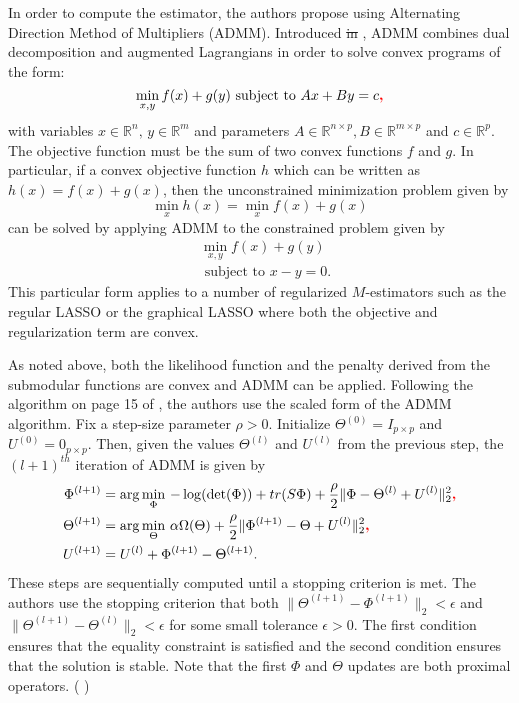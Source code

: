 \documentclass{uwstat572}
\newcommand{\vmdel}[1]{\sout{#1}}
\newcommand{\vmadd}[1]{\textbf{\color{red}{#1}}}
\newcommand{\vmcomment}[1]{({\color{blue}{VM's comment:}} \textbf{\color{blue}{#1}})}
\theoremstyle{remark}
\theoremstyle{definition}
\begin{document}
In order to compute the estimator, the authors propose using Alternating Direction Method of Multipliers (ADMM).  Introduced \vmdel{in} \vmadd{by} \cite{Boyd2011}, ADMM combines dual decomposition and augmented Lagrangians in order to solve convex programs of the form:
\begin{equation*}
    \min_{x,y} f(x) + g(y) {\text{  subject to }} Ax + By = c\vmadd{,}
\end{equation*}
with variables $x \in \mathbb{R}^n, \, y \in \mathbb{R}^m$ and parameters $A \in \mathbb{R}^{n \times p}, B \in \mathbb{R}^{m \times p}$ and $c \in \mathbb{R}^p$.  The objective function must be the sum of two convex functions $f$ and $g$.  In particular, if a convex objective function $h$ which can be written as $h(x) = f(x) + g(x)$, then the unconstrained minimization problem given by
\begin{equation*}
\min_{x} h(x) = \min_{x} f(x) + g(x)
\end{equation*}
can be solved by applying ADMM to the constrained problem given by
\begin{align*}
& \min_{x,y} f(x) + g(y) 
\\
& {\text{ subject to }} x - y = 0.
\end{align*}
This particular form applies to a number of regularized $M$-estimators such as the regular LASSO or the graphical LASSO where both the objective and regularization term\vmadd{s} are convex.  

As noted above, both the likelihood function and the penalty derived from the submodular functions are convex and ADMM can be applied. Following the algorithm on page 15 of \citep{Boyd2011}, the authors use the scaled form of the ADMM algorithm.  Fix a step-size parameter $\rho > 0$.  Initialize $\Theta^{(0)} = I_{p\times p}$ and $U^{(0)} = 0_{p \times p}$.  Then, given the values $\Theta^{(l)}$ and $U^{(l)}$ from the previous step, the $(l+1)^{th}$ iteration of ADMM is given by
\begin{align}
\Phi^{(l+1)} & =  \arg\min_{\Phi} \, -\log(\det(\Phi)) + tr(S \Phi) + \frac{\rho}{2}\| \Phi - \Theta^{(l)} + U^{(l)}\|_2^2\vmadd{,}
\label{likprox}
\\
\Theta^{(l+1)} & = \arg \min_{\Theta} \, \alpha \Omega(\Theta) + \frac{\rho}{2} \| \Phi^{(l+1)} - \Theta + U^{(l)} \|_2^2\vmadd{,}
\label{omegaprox}
\\
U^{(l+1)} & = U^{(l)} + \Phi^{(l+1)} - \Theta^{(l+1)}.
\label{resid}
\end{align}
These steps are sequentially computed until a stopping criterion is met.  The authors use the stopping criterion that both $\|\Theta^{(l+1)} - \Phi^{(l+1)}\|_2 < \epsilon$ and $\|\Theta^{(l+1)} - \Theta^{(l)}\|_2 < \epsilon$ for some small tolerance $\epsilon > 0$.  The first condition ensures that the equality constraint is satisfied and the second condition ensures that the solution is stable.  Note that the first $\Phi$ and $\Theta$ updates are both proximal operators. \vmcomment{Proximal operators are not defined.}
\end{document}
